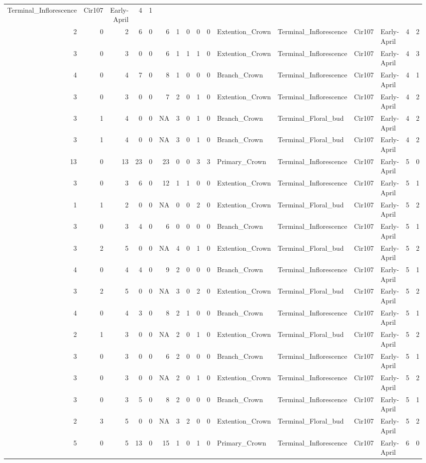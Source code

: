 \documentclass[]{article}
\begin{document}
\begin{longtable}[]{@{}rrrrrrrrrrllllrl@{}}
Terminal\_Inflorescence & Cir107 & Early-April & 4 & 1\tabularnewline
2 & 0 & 2 & 6 & 0 & 6 & 1 & 0 & 0 & 0 & Extention\_Crown &
Terminal\_Inflorescence & Cir107 & Early-April & 4 & 2\tabularnewline
3 & 0 & 3 & 0 & 0 & 6 & 1 & 1 & 1 & 0 & Extention\_Crown &
Terminal\_Inflorescence & Cir107 & Early-April & 4 & 3\tabularnewline
4 & 0 & 4 & 7 & 0 & 8 & 1 & 0 & 0 & 0 & Branch\_Crown &
Terminal\_Inflorescence & Cir107 & Early-April & 4 & 1\tabularnewline
3 & 0 & 3 & 0 & 0 & 7 & 2 & 0 & 1 & 0 & Extention\_Crown &
Terminal\_Inflorescence & Cir107 & Early-April & 4 & 2\tabularnewline
3 & 1 & 4 & 0 & 0 & NA & 3 & 0 & 1 & 0 & Branch\_Crown &
Terminal\_Floral\_bud & Cir107 & Early-April & 4 & 2\tabularnewline
3 & 1 & 4 & 0 & 0 & NA & 3 & 0 & 1 & 0 & Branch\_Crown &
Terminal\_Floral\_bud & Cir107 & Early-April & 4 & 2\tabularnewline
13 & 0 & 13 & 23 & 0 & 23 & 0 & 0 & 3 & 3 & Primary\_Crown &
Terminal\_Inflorescence & Cir107 & Early-April & 5 & 0\tabularnewline
3 & 0 & 3 & 6 & 0 & 12 & 1 & 1 & 0 & 0 & Extention\_Crown &
Terminal\_Inflorescence & Cir107 & Early-April & 5 & 1\tabularnewline
1 & 1 & 2 & 0 & 0 & NA & 0 & 0 & 2 & 0 & Extention\_Crown &
Terminal\_Floral\_bud & Cir107 & Early-April & 5 & 2\tabularnewline
3 & 0 & 3 & 4 & 0 & 6 & 0 & 0 & 0 & 0 & Branch\_Crown &
Terminal\_Inflorescence & Cir107 & Early-April & 5 & 1\tabularnewline
3 & 2 & 5 & 0 & 0 & NA & 4 & 0 & 1 & 0 & Extention\_Crown &
Terminal\_Floral\_bud & Cir107 & Early-April & 5 & 2\tabularnewline
4 & 0 & 4 & 4 & 0 & 9 & 2 & 0 & 0 & 0 & Branch\_Crown &
Terminal\_Inflorescence & Cir107 & Early-April & 5 & 1\tabularnewline
3 & 2 & 5 & 0 & 0 & NA & 3 & 0 & 2 & 0 & Extention\_Crown &
Terminal\_Floral\_bud & Cir107 & Early-April & 5 & 2\tabularnewline
4 & 0 & 4 & 3 & 0 & 8 & 2 & 1 & 0 & 0 & Branch\_Crown &
Terminal\_Inflorescence & Cir107 & Early-April & 5 & 1\tabularnewline
2 & 1 & 3 & 0 & 0 & NA & 2 & 0 & 1 & 0 & Extention\_Crown &
Terminal\_Floral\_bud & Cir107 & Early-April & 5 & 2\tabularnewline
3 & 0 & 3 & 0 & 0 & 6 & 2 & 0 & 0 & 0 & Branch\_Crown &
Terminal\_Inflorescence & Cir107 & Early-April & 5 & 1\tabularnewline
3 & 0 & 3 & 0 & 0 & NA & 2 & 0 & 1 & 0 & Extention\_Crown &
Terminal\_Inflorescence & Cir107 & Early-April & 5 & 2\tabularnewline
3 & 0 & 3 & 5 & 0 & 8 & 2 & 0 & 0 & 0 & Branch\_Crown &
Terminal\_Inflorescence & Cir107 & Early-April & 5 & 1\tabularnewline
2 & 3 & 5 & 0 & 0 & NA & 3 & 2 & 0 & 0 & Extention\_Crown &
Terminal\_Floral\_bud & Cir107 & Early-April & 5 & 2\tabularnewline
5 & 0 & 5 & 13 & 0 & 15 & 1 & 0 & 1 & 0 & Primary\_Crown &
Terminal\_Inflorescence & Cir107 & Early-April & 6 & 0\tabularnewline

\end{longtable}
\end{document}
